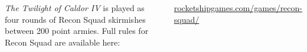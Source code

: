 \clearpage
{}

\begin{columns}

  \emph{The Twilight of Caldor IV} is played as four rounds of Recon
  Squad skirmishes between 200 point armies.  Full rules for Recon
  Squad are available here:

\centerline{\url{rocketshipgames.com/games/recon-squad/}}

\end{columns}

\vfill
\noindent
